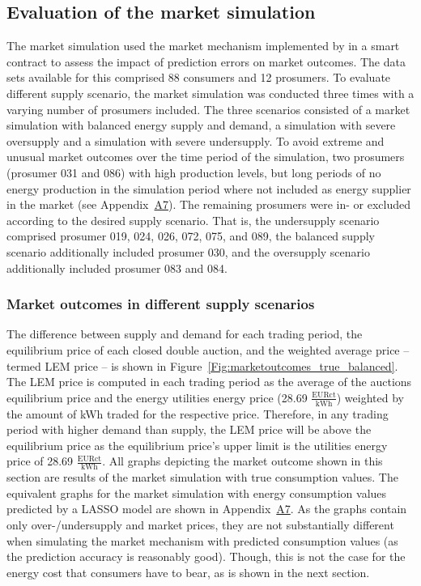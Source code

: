 
\subsection{Evaluation of the market simulation}\label{Sec:Results;Subsec:Simulation}

The market simulation used the market mechanism implemented by \citet{Mengelkamp:2018a} in a smart contract to assess the impact of prediction errors on market outcomes. The data sets available for this comprised 88 consumers and 12 prosumers. To evaluate different supply scenario, the market simulation was conducted three times with a varying number of prosumers included. The three scenarios consisted of a market simulation with balanced energy supply and demand, a simulation with severe oversupply and a simulation with severe undersupply. To avoid extreme and unusual market outcomes over the time period of the simulation, two prosumers (prosumer 031 and 086) with high production levels, but long periods of no energy production in the simulation period where not included as energy supplier in the market (see Appendix~\hyperlink{AppA7:Figures:producer_all}{A7}). The remaining prosumers were in- or excluded according to the desired supply scenario. That is, the undersupply scenario comprised prosumer 019, 024, 026, 072, 075, and 089, the balanced supply scenario additionally included prosumer 030, and the oversupply scenario additionally included prosumer 083 and 084.

\subsubsection{Market outcomes in different supply scenarios}

The difference between supply and demand for each trading period, the equilibrium price of each closed double auction, and the weighted average price -- termed LEM price -- is shown in Figure~\ref{Fig:marketoutcomes_true_balanced}. The LEM price is computed in each trading period as the average of the auctions equilibrium price and the energy utilities energy price (28.69 $\frac{\text{EURct}}{\text{kWh}}$) weighted by the amount of kWh traded for the respective price. Therefore, in any trading period with higher demand than supply, the LEM price will be above the equilibrium price as the equilibrium price's upper limit is the utilities energy price of 28.69 $\frac{\text{EURct}}{\text{kWh}}$. All graphs depicting the market outcome shown in this section are results of the market simulation with true consumption values. The equivalent graphs for the market simulation with energy consumption values predicted by a LASSO model are shown in Appendix~\hyperlink{AppA7:Figures:marketsimulation_pred}{A7}. As the graphs contain only over-/undersupply and market prices, they are not substantially different when simulating the market mechanism with predicted consumption values (as the prediction accuracy is reasonably good). Though, this is not the case for the energy cost that consumers have to bear, as is shown in the next section.

